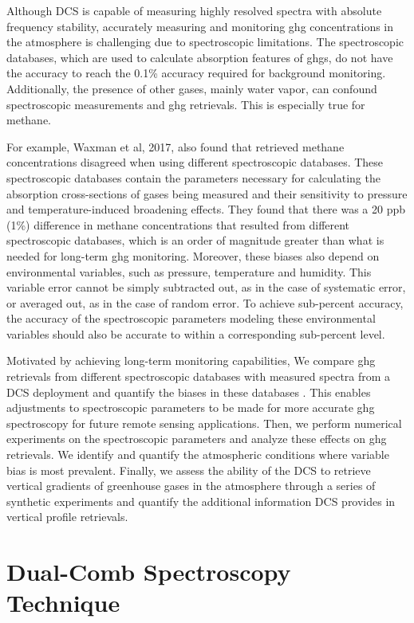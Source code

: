 \documentclass[amt, manuscript]{copernicus}
\begin{document}
Although DCS is capable of measuring highly resolved spectra with absolute frequency stability, accurately measuring and monitoring ghg concentrations in the atmosphere is challenging due to spectroscopic limitations. The spectroscopic databases, which are used to calculate absorption features of ghgs, do not have the accuracy to reach the 0.1\% accuracy required for background monitoring. Additionally, the presence of other gases, mainly water vapor, can confound spectroscopic measurements and ghg retrievals. This is especially true for methane.

For example, Waxman et al, 2017, also found that retrieved methane concentrations disagreed when using different spectroscopic databases. These spectroscopic databases contain the parameters necessary for calculating the absorption cross-sections of gases being measured and their sensitivity to pressure and temperature-induced broadening effects. They found that there was a 20 ppb (1\%) difference in methane concentrations that resulted from different spectroscopic databases, which is an order of magnitude greater than what is needed for long-term ghg monitoring. Moreover, these biases also depend on environmental variables, such as pressure, temperature and humidity. This variable error cannot be simply subtracted out, as in the case of systematic error, or averaged out, as in the case of random error. To achieve sub-percent accuracy, the accuracy of the spectroscopic parameters modeling these environmental variables should also be accurate to within a corresponding sub-percent level.

Motivated by achieving long-term monitoring capabilities, We compare ghg retrievals from different spectroscopic databases with measured spectra from a DCS deployment and quantify the biases in these databases . This enables adjustments to spectroscopic parameters to be made for more accurate ghg spectroscopy for future remote sensing applications. Then, we perform numerical experiments on the spectroscopic parameters and analyze these effects on ghg retrievals. We identify and quantify the atmospheric conditions where variable bias is most prevalent. Finally, we assess the ability of the DCS to retrieve vertical gradients of greenhouse gases in the atmosphere through a series of synthetic experiments and quantify the additional information DCS provides in vertical profile retrievals. 

\section{Dual-Comb Spectroscopy Technique }
\end{document}
